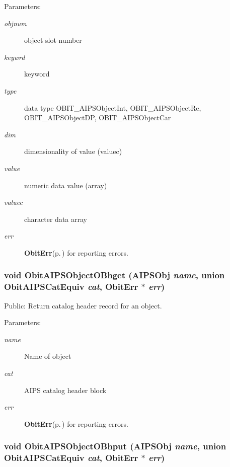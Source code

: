 \begin{Desc}
\item[Parameters:]
\begin{description}
\item[{\em objnum}]object slot number \item[{\em keywrd}]keyword \item[{\em type}]data type OBIT\_\-AIPSObject\-Int, OBIT\_\-AIPSObject\-Re, OBIT\_\-AIPSObject\-DP, OBIT\_\-AIPSObject\-Car \item[{\em dim}]dimensionality of value (valuec) \item[{\em value}]numeric data value (array) \item[{\em valuec}]character data array \item[{\em err}]{\bf Obit\-Err}{\rm (p.\,\pageref{structObitErr})} for reporting errors. \end{description}
\end{Desc}
\subsubsection{\setlength{\rightskip}{0pt plus 5cm}void Obit\-AIPSObject\-OBhget ({\bf AIPSObj} {\em name}, union {\bf Obit\-AIPSCat\-Equiv} {\em cat}, {\bf Obit\-Err} $\ast$ {\em err})}\label{ObitAIPSObject_8c_a34}


Public: Return catalog header record for an object. 

\begin{Desc}
\item[Parameters:]
\begin{description}
\item[{\em name}]Name of object \item[{\em cat}]AIPS catalog header block \item[{\em err}]{\bf Obit\-Err}{\rm (p.\,\pageref{structObitErr})} for reporting errors. \end{description}
\end{Desc}
\subsubsection{\setlength{\rightskip}{0pt plus 5cm}void Obit\-AIPSObject\-OBhput ({\bf AIPSObj} {\em name}, union {\bf Obit\-AIPSCat\-Equiv} {\em cat}, {\bf Obit\-Err} $\ast$ {\em err})}\label{ObitAIPSObject_8c_a35}


